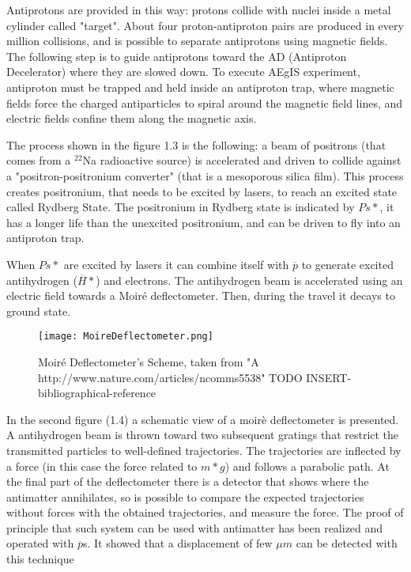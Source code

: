 Antiprotons are provided in this way:
protons collide with nuclei inside a metal cylinder called "target". About four proton-antiproton pairs are produced in every million collisions, and is possible to separate antiprotons using magnetic fields. The following step is to guide antiprotons toward the AD (Antiproton Decelerator) where they are slowed down. To execute AEgIS experiment, antiproton must be trapped and held inside an antiproton trap, where magnetic fields force the charged antiparticles to spiral around the magnetic field lines, and electric fields confine them along the magnetic axis.

The process shown in the figure 1.3 is the following: a beam of positrons (that comes from a $^{22}$Na radioactive source) is accelerated and driven to collide against a "positron-positronium converter" (that is a mesoporous silica film). This process creates positronium, that needs to be excited by lasers, to reach an excited state called Rydberg State. The positronium in Rydberg state is indicated by $ {Ps*} $, it has a longer life than the unexcited positronium, and can be driven to fly into an antiproton trap.


When $ {Ps*} $ are excited by lasers it can combine itself with $ \overline{p} $ to generate excited antihydrogen ($ \overline{H}* $) and electrons. The antihydrogen beam is accelerated using an electric field towards a Moiré deflectometer. Then, during the travel it decays to ground state.  


\begin{figure}[H]
\centering
\texttt{[image: MoireDeflectometer.png]} 
\caption{Moiré Deflectometer's Scheme, taken from "A
http://www.nature.com/articles/ncomms5538" TODO INSERT-bibliographical-reference}
\end{figure}

In the second figure (1.4) a schematic view of a moirè deflectometer is presented.
A antihydrogen beam is thrown toward two subsequent gratings that restrict the transmitted particles to well-defined trajectories. The trajectories are inflected by a force (in this case the force related to $ {m*g} $) and follows a parabolic path. At the final part of the deflectometer there is a detector that shows where the antimatter annihilates, so is possible to compare the expected trajectories without forces with the obtained trajectories, and measure the force. The proof of principle that such system can be used with antimatter has been realized and operated with $ \overline{p} $s. It showed that a displacement of few $ \mu m $ can be detected with this technique %


